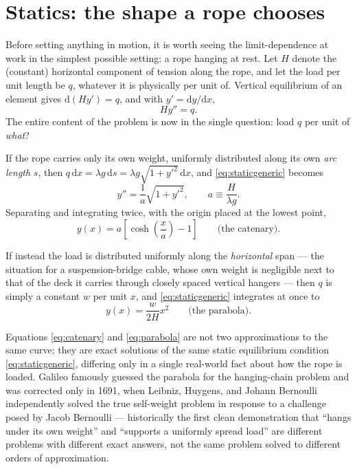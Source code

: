 \documentclass[11pt]{book}
\newcommand{\dd}{\mathrm{d}}
\begin{document}
\section{Statics: the shape a rope chooses}
\label{sec:statics}

Before setting anything in motion, it is worth seeing the limit-dependence at work in the simplest possible setting: a rope hanging at rest. Let $H$ denote the (constant) horizontal component of tension along the rope, and let the load per unit length be $q$, whatever it is physically per unit of. Vertical equilibrium of an element gives $\dd(Hy') = q$, and with $y'=\dd y/\dd x$,
\begin{equation}
H y'' = q.
\label{eq:staticgeneric}
\end{equation}
The entire content of the problem is now in the single question: load $q$ per unit of \emph{what}?

If the rope carries only its own weight, uniformly distributed along its own \emph{arc length} $s$, then $q\,\dd x = \lambda g\,\dd s = \lambda g\sqrt{1+y'^2}\,\dd x$, and \eqref{eq:staticgeneric} becomes
\[
y'' = \frac1a\sqrt{1+y'^2}, \qquad a \equiv \frac{H}{\lambda g}.
\]
Separating and integrating twice, with the origin placed at the lowest point,
\begin{equation}
y(x) = a\left[\cosh\!\left(\frac{x}{a}\right) - 1\right] \qquad \text{(the catenary).}
\label{eq:catenary}
\end{equation}

If instead the load is distributed uniformly along the \emph{horizontal} span --- the situation for a suspension-bridge cable, whose own weight is negligible next to that of the deck it carries through closely spaced vertical hangers --- then $q$ is simply a constant $w$ per unit $x$, and \eqref{eq:staticgeneric} integrates at once to
\begin{equation}
y(x) = \frac{w}{2H}x^2 \qquad \text{(the parabola).}
\label{eq:parabola}
\end{equation}

Equations \eqref{eq:catenary} and \eqref{eq:parabola} are not two approximations to the same curve; they are exact solutions of the same static equilibrium condition \eqref{eq:staticgeneric}, differing only in a single real-world fact about how the rope is loaded. Galileo famously guessed the parabola for the hanging-chain problem and was corrected only in 1691, when Leibniz, Huygens, and Johann Bernoulli independently solved the true self-weight problem in response to a challenge posed by Jacob Bernoulli --- historically the first clean demonstration that ``hangs under its own weight'' and ``supports a uniformly spread load'' are different problems with different exact answers, not the same problem solved to different orders of approximation.
\end{document}
